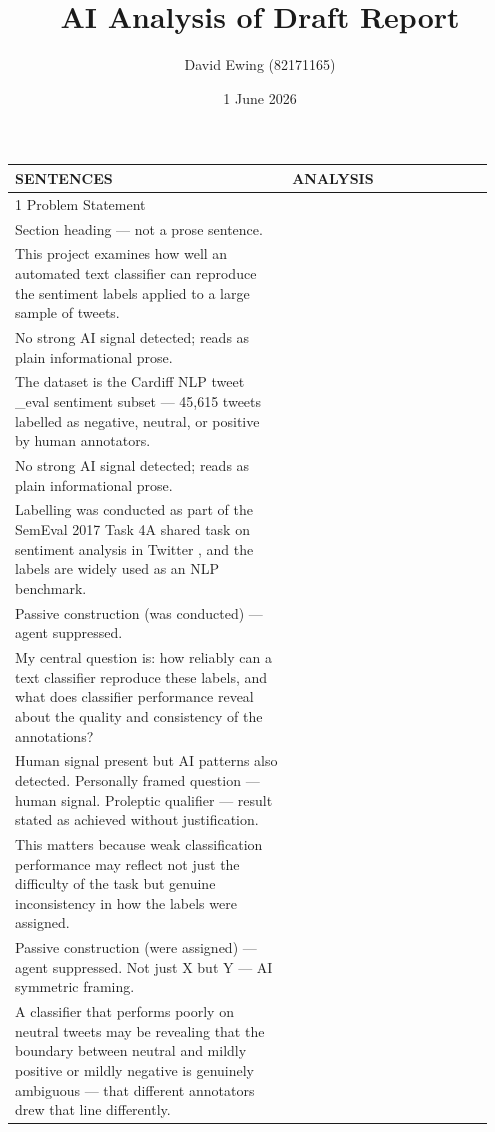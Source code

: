 \documentclass[11pt]{article}
\title{AI Analysis of Draft Report}
\author{David Ewing (82171165)}
\date{1 June 2026}
\begin{document}
\maketitle
\thispagestyle{empty}
\newpage

\setlength{\LTleft}{0pt}
\setlength{\LTright}{0pt}
\begin{longtable}{|p{0.55\linewidth}|p{0.40\linewidth}|}
\hline
\centering\textbf{SENTENCES} & \centering\textbf{ANALYSIS} \tabularnewline[2pt]
\hline
\endhead
1 Problem Statement & \\[2pt]
\hline
Section heading --- not a prose sentence. & \\
\hline
This project examines how well an automated text classifier can reproduce the sentiment labels applied to a large sample of tweets. & \\[2pt]
\hline
No strong AI signal detected; reads as plain informational prose. & \\
\hline
The dataset is the Cardiff NLP tweet \_eval sentiment subset --- 45,615 tweets labelled as negative, neutral, or positive by human annotators. & \\[2pt]
\hline
No strong AI signal detected; reads as plain informational prose. & \\
\hline
Labelling was conducted as part of the SemEval 2017 Task 4A shared task on sentiment analysis in Twitter , and the labels are widely used as an NLP benchmark. & \\[2pt]
\hline
Passive construction (was conducted) --- agent suppressed. & \\
\hline
My central question is: how reliably can a text classifier reproduce these labels, and what does classifier performance reveal about the quality and consistency of the annotations? & \\[2pt]
\hline
Human signal present but AI patterns also detected. Personally framed question --- human signal. Proleptic qualifier --- result stated as achieved without justification. & \\
\hline
This matters because weak classification performance may reflect not just the difficulty of the task but genuine inconsistency in how the labels were assigned. & \\[2pt]
\hline
Passive construction (were assigned) --- agent suppressed. Not just X but Y --- AI symmetric framing. & \\
\hline
A classifier that performs poorly on neutral tweets may be revealing that the boundary between neutral and mildly positive or mildly negative is genuinely ambiguous --- that different annotators drew that line differently. & \\[2pt]

\end{longtable}
\end{document}
